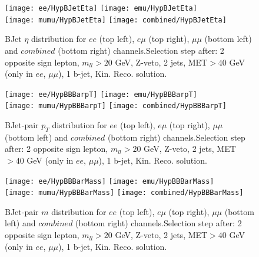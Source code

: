 \documentclass[12pt, a4paper, titlepage]{article}
\begin{document}
\clearpage
\newpage

\begin{figure}
  \texttt{[image: ee/HypBJetEta]}
  \texttt{[image: emu/HypBJetEta]}\\
  \texttt{[image: mumu/HypBJetEta]}
  \texttt{[image: combined/HypBJetEta]}
\caption{BJet $\eta$ distribution for $ee$ (top left), $e\mu$ (top right), $\mu\mu$ (bottom left) and $combined$ (bottom right) channels.\newline Selection step after: 2 opposite sign lepton, $m_{ll}>20$ GeV, Z-veto, 2 jets, MET$>40$ GeV (only in $ee$, $\mu\mu$), 1 b-jet, Kin. Reco. solution.}
\end{figure}

\clearpage
\newpage




\begin{figure}
  \texttt{[image: ee/HypBBBarpT]}
  \texttt{[image: emu/HypBBBarpT]}\\
  \texttt{[image: mumu/HypBBBarpT]}
  \texttt{[image: combined/HypBBBarpT]}
\caption{BJet-pair $p_T$ distribution for $ee$ (top left), $e\mu$ (top right), $\mu\mu$ (bottom left) and $combined$ (bottom right) channels.\newline Selection step after: 2 opposite sign lepton, $m_{ll}>20$ GeV, Z-veto, 2 jets, MET$>40$ GeV (only in $ee$, $\mu\mu$), 1 b-jet, Kin. Reco. solution.}
\end{figure}

\clearpage
\newpage


\begin{figure}
  \texttt{[image: ee/HypBBBarMass]}
  \texttt{[image: emu/HypBBBarMass]}\\
  \texttt{[image: mumu/HypBBBarMass]}
  \texttt{[image: combined/HypBBBarMass]}
\caption{BJet-pair $m$ distribution for $ee$ (top left), $e\mu$ (top right), $\mu\mu$ (bottom left) and $combined$ (bottom right) channels.\newline Selection step after: 2 opposite sign lepton, $m_{ll}>20$ GeV, Z-veto, 2 jets, MET$>40$ GeV (only in $ee$, $\mu\mu$), 1 b-jet, Kin. Reco. solution.}
\end{figure}
\end{document}
